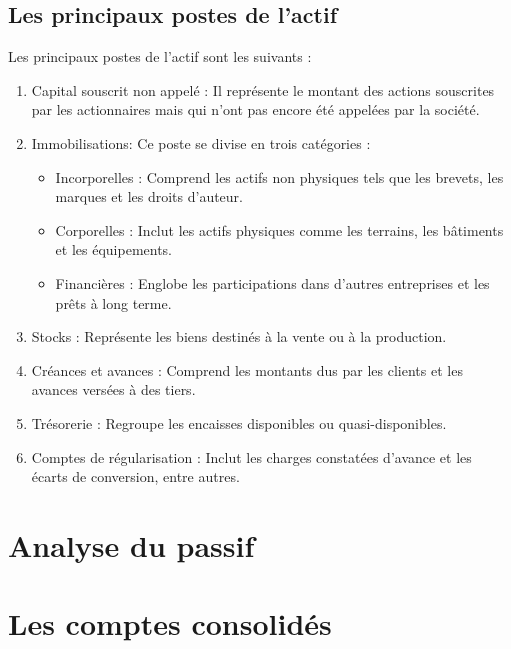 \documentclass[a4paper, 12pt]{report}
\begin{document}
\subsection{Les principaux postes de l'actif}

Les principaux postes de l'actif sont les suivants :

\begin{enumerate}
	\item Capital souscrit non appelé : Il représente le montant des actions souscrites par les actionnaires mais qui n'ont pas encore été appelées par la société.
	\item Immobilisations: Ce poste se divise en trois catégories :
\begin{itemize}
	\item  Incorporelles : Comprend les actifs non physiques tels que les brevets, les marques et les droits d'auteur.
	\item  Corporelles : Inclut les actifs physiques comme les terrains, les bâtiments et les équipements.	
	\item Financières : Englobe les participations dans d'autres entreprises et les prêts à long terme.
\end{itemize}
	\item Stocks : Représente les biens destinés à la vente ou à la production.
	\item Créances et avances : Comprend les montants dus par les clients et les avances versées à des tiers.
	\item Trésorerie : Regroupe les encaisses disponibles ou quasi-disponibles.
	\item Comptes de régularisation : Inclut les charges constatées d'avance et les écarts de conversion, entre autres.
\end{enumerate}

\section{Analyse du passif}



\section{Les comptes consolidés}
\end{document}
